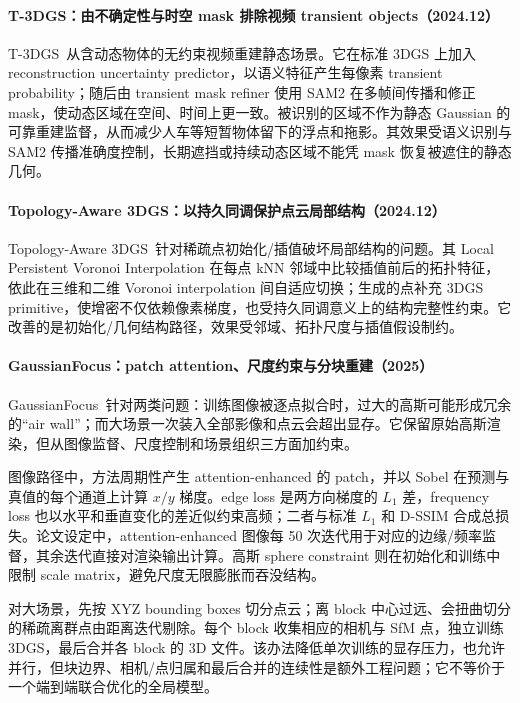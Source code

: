 \paragraph{T-3DGS：由不确定性与时空 mask 排除视频 transient objects（2024.12）}
T-3DGS~\cite{2412_00155}从含动态物体的无约束视频重建静态场景。它在标准 3DGS 上加入 reconstruction uncertainty predictor，以语义特征产生每像素 transient probability；随后由 transient mask refiner 使用 SAM2 在多帧间传播和修正 mask，使动态区域在空间、时间上更一致。被识别的区域不作为静态 Gaussian 的可靠重建监督，从而减少人车等短暂物体留下的浮点和拖影。其效果受语义识别与 SAM2 传播准确度控制，长期遮挡或持续动态区域不能凭 mask 恢复被遮住的静态几何。


\paragraph{Topology-Aware 3DGS：以持久同调保护点云局部结构（2024.12）}
Topology-Aware 3DGS~\cite{2412_16619}针对稀疏点初始化/插值破坏局部结构的问题。其 Local Persistent Voronoi Interpolation 在每点 kNN 邻域中比较插值前后的拓扑特征，依此在三维和二维 Voronoi interpolation 间自适应切换；生成的点补充 3DGS primitive，使增密不仅依赖像素梯度，也受持久同调意义上的结构完整性约束。它改善的是初始化/几何结构路径，效果受邻域、拓扑尺度与插值假设制约。


\paragraph{GaussianFocus：patch attention、尺度约束与分块重建（2025）\cite{2503_17798}}
GaussianFocus~\cite{2503_17798}针对两类问题：训练图像被逐点拟合时，过大的高斯可能形成冗余的“air wall”；而大场景一次装入全部影像和点云会超出显存。它保留原始高斯渲染，但从图像监督、尺度控制和场景组织三方面加约束。

图像路径中，方法周期性产生 attention-enhanced 的 patch，并以 Sobel 在预测与真值的每个通道上计算 $x/y$ 梯度。edge loss 是两方向梯度的 $L_1$ 差，frequency loss 也以水平和垂直变化的差近似约束高频；二者与标准 $L_1$ 和 D-SSIM 合成总损失。论文设定中，attention-enhanced 图像每 50 次迭代用于对应的边缘/频率监督，其余迭代直接对渲染输出计算。高斯 sphere constraint 则在初始化和训练中限制 scale matrix，避免尺度无限膨胀而吞没结构。

对大场景，先按 XYZ bounding boxes 切分点云；离 block 中心过远、会扭曲切分的稀疏离群点由距离迭代剔除。每个 block 收集相应的相机与 SfM 点，独立训练 3DGS，最后合并各 block 的 3D 文件。该办法降低单次训练的显存压力，也允许并行，但块边界、相机/点归属和最后合并的连续性是额外工程问题；它不等价于一个端到端联合优化的全局模型。

